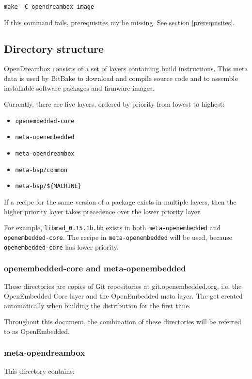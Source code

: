 \documentclass[a4paper]{article}
\newcommand{\shell}[1]{\texttt{\small #1}}
\begin{document}
    \shell{make -C opendreambox image}

    If this command fails, prerequisites my be missing. See section \ref{prerequisites}.

  \subsection{Directory structure}
    OpenDreambox consists of a set of layers containing build instructions.
    This meta data is used by BitBake to download and compile source code
    and to assemble installable software packages and firmware images.

    Currently, there are five layers, ordered by priority from lowest to
    highest:

    \begin{itemize}
      \item \shell{openembedded-core}
      \item \shell{meta-openembedded}
      \item \shell{meta-opendreambox}
      \item \shell{meta-bsp/common}
      \item \shell{meta-bsp/\$\{MACHINE\}}
    \end{itemize}

    If a recipe for the same version of a package exists in multiple layers,
    then the higher priority layer takes precedence over the lower priority
    layer.

    For example, \shell{libmad\_0.15.1b.bb} exists in both
    \shell{meta-openembedded} and \shell{openembedded-core}. The recipe in
    \shell{meta-openembedded} will be used, because \shell{openembedded-core}
    has lower priority.

    \subsubsection{openembedded-core and meta-openembedded}
       These directories are copies of Git repositories at git.openembedded.org, i.e.
       the OpenEmbedded Core layer and the OpenEmbedded meta layer. The get created
       automatically when building the distribution for the first time.

       Throughout this document, the combination of these directories will be
       referred to as OpenEmbedded.

    \subsubsection{meta-opendreambox}
      This directory contains:
\end{document}
